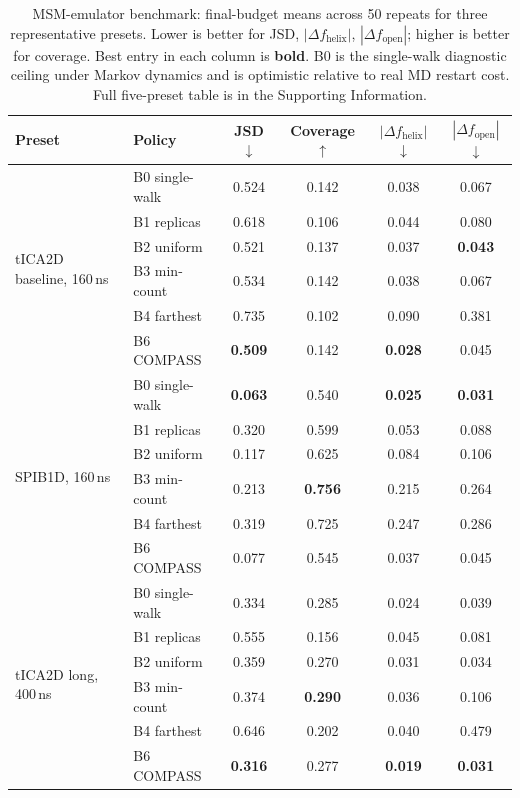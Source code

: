 \documentclass[journal=jctcce,manuscript=article,layout=twocolumn]{achemso}
\begin{document}
\begin{table}[htbp]
    \centering
    \caption{MSM-emulator benchmark: final-budget means across 50 repeats for three representative presets. Lower is better for JSD, $|\Delta f_{\mathrm{helix}}|$, $|\Delta f_{\mathrm{open}}|$; higher is better for coverage. Best entry in each column is \textbf{bold}. B0 is the single-walk diagnostic ceiling under Markov dynamics and is optimistic relative to real MD restart cost. Full five-preset table is in the Supporting Information.}
    \label{tab:msm_benchmark}
    \small
    \setlength{\tabcolsep}{4pt}
    \begin{tabular}{llcccc}
        \toprule
        Preset & Policy & JSD $\downarrow$ & Coverage $\uparrow$ & $|\Delta f_{\mathrm{helix}}|$ $\downarrow$ & $|\Delta f_{\mathrm{open}}|$ $\downarrow$ \\
        \midrule
        \multirow{6}{*}{tICA2D baseline, 160\,ns} & B0 single-walk & 0.524 & 0.142 & 0.038 & 0.067 \\
        & B1 replicas & 0.618 & 0.106 & 0.044 & 0.080 \\
        & B2 uniform & 0.521 & 0.137 & 0.037 & \textbf{0.043} \\
        & B3 min-count & 0.534 & 0.142 & 0.038 & 0.067 \\
        & B4 farthest & 0.735 & 0.102 & 0.090 & 0.381 \\
        & B6 COMPASS & \textbf{0.509} & 0.142 & \textbf{0.028} & 0.045 \\
        \midrule
        \multirow{6}{*}{SPIB1D, 160\,ns} & B0 single-walk & \textbf{0.063} & 0.540 & \textbf{0.025} & \textbf{0.031} \\
        & B1 replicas & 0.320 & 0.599 & 0.053 & 0.088 \\
        & B2 uniform & 0.117 & 0.625 & 0.084 & 0.106 \\
        & B3 min-count & 0.213 & \textbf{0.756} & 0.215 & 0.264 \\
        & B4 farthest & 0.319 & 0.725 & 0.247 & 0.286 \\
        & B6 COMPASS & 0.077 & 0.545 & 0.037 & 0.045 \\
        \midrule
        \multirow{6}{*}{tICA2D long, 400\,ns} & B0 single-walk & 0.334 & 0.285 & 0.024 & 0.039 \\
        & B1 replicas & 0.555 & 0.156 & 0.045 & 0.081 \\
        & B2 uniform & 0.359 & 0.270 & 0.031 & 0.034 \\
        & B3 min-count & 0.374 & \textbf{0.290} & 0.036 & 0.106 \\
        & B4 farthest & 0.646 & 0.202 & 0.040 & 0.479 \\
        & B6 COMPASS & \textbf{0.316} & 0.277 & \textbf{0.019} & \textbf{0.031} \\
        \bottomrule
    \end{tabular}
\end{table}
\end{document}
